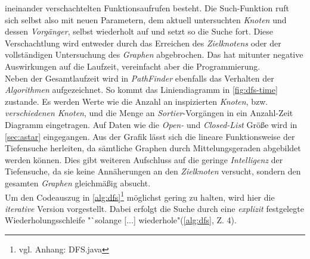 \documentclass[12pt]{article}
\begin{document}
\noindent ineinander verschachtelten Funktionsaufrufen besteht. Die Such-Funktion ruft sich selbst also mit neuen Parametern, dem aktuell untersuchten \textit{Knoten} und dessen \textit{Vorgänger}, selbst wiederholt auf und setzt so die Suche fort. Diese Verschachtlung wird entweder durch das Erreichen des \textit{Zielknotens} oder der vollständigen Untersuchung des \textit{Graphen} abgebrochen. Das hat mitunter negative Auswirkungen auf die Laufzeit, vereinfacht aber die Programmierung. 
\\
Neben der Gesamtlaufzeit wird in \textit{PathFinder} ebenfalls das Verhalten der \textit{Algorithmen} aufgezeichnet. So kommt das Liniendiagramm in \autoref{fig:dfs-time} zustande. Es werden Werte wie die Anzahl an inspizierten \textit{Knoten}, bzw. \textit{verschiedenen Knoten}, und die Menge an \textit{Sortier}-Vorgängen in ein Anzahl-Zeit Diagramm eingetragen. Auf Daten wie die \textit{Open-} und \textit{Closed-List} Größe wird in \autoref{sec:astar} eingegangen. Aus der Grafik lässt sich die lineare Funktionsweise der Tiefensuche herleiten, da sämtliche Graphen durch Mittelungsgeraden abgebildet werden können. Dies gibt weiteren Aufschluss auf die geringe \textit{Intelligenz} der Tiefensuche, da sie keine Annäherungen an den \textit{Zielknoten} versucht, sondern den gesamten \textit{Graphen} gleichmäßig absucht.
\\
Um den Codeauszug in \autoref{alg:dfs}\footnote{vgl. Anhang: DFS.java} möglichst gering zu halten, wird hier die \textit{iterative} Version vorgestellt. Dabei erfolgt die Suche durch eine \textit{explizit} festgelegte Wiederholungsschleife "`solange [...] wiederhole"(\autoref{alg:dfs}, Z. 4). 
\end{document}
